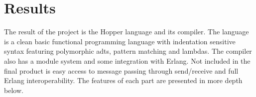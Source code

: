 \chapter{Results}

The result of the project is the Hopper language and its compiler. The language is a clean basic functional programming language with indentation sensitive syntax featuring polymorphic \glspl{adt}, pattern matching and lambdas. The compiler also has a module system and some integration with Erlang. Not included in the final product is easy access to message passing through send/receive and full Erlang interoperability. The features of each part are presented in more depth below. 



